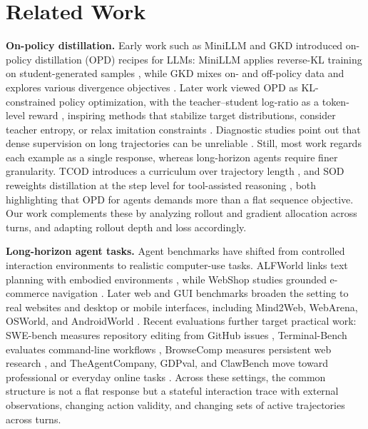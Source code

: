 \section{Related Work}
\label{sec:related}

\textbf{On-policy distillation.}
Early work such as MiniLLM and GKD introduced on-policy distillation (OPD) recipes for LLMs: MiniLLM applies reverse-KL training on student-generated samples \citep{gu2024minillm}, while GKD mixes on- and off-policy data and explores various divergence objectives \citep{agarwal2024opd}. Later work viewed OPD as KL-constrained policy optimization, with the teacher--student log-ratio as a token-level reward \citep{lu2025onpolicydistillation,yang2026gopd}, inspiring methods that stabilize target distributions, consider teacher entropy, or relax imitation constraints \citep{jang2026veto,jin2026entropy,ko2026reopold,zhao2026self}. Diagnostic studies point out that dense supervision on long trajectories can be unreliable \citep{li2026rethinking,zhang2026full}. Still, most work regards each example as a single response, whereas long-horizon agents require finer granularity. TCOD introduces a curriculum over trajectory length \citep{wang2026tcod}, and SOD reweights distillation at the step level for tool-assisted reasoning \citep{zhong2026sod}, both highlighting that OPD for agents demands more than a flat sequence objective. Our work complements these by analyzing rollout and gradient allocation across turns, and adapting rollout depth and loss accordingly.

\textbf{Long-horizon agent tasks.}
Agent benchmarks have shifted from controlled interaction
environments to realistic computer-use tasks. ALFWorld links text planning with
embodied environments \citep{shridhar2021alfworld}, while WebShop studies grounded
e-commerce navigation \citep{yao2022webshop}. Later web and GUI
benchmarks broaden the setting to real websites and desktop or mobile
interfaces, including Mind2Web, WebArena, OSWorld, and AndroidWorld
\citep{deng2023mind2web,zhou2023webarena,xie2024osworld,rawles2025androidworld}.
Recent evaluations further target practical work: SWE-bench measures repository
editing from GitHub issues \citep{jimenez2023swebench}, Terminal-Bench evaluates
command-line workflows \citep{merrill2026terminalbench}, BrowseComp measures
persistent web research \citep{wei2025browsecomp}, and TheAgentCompany,
GDPval, and ClawBench move toward professional or everyday online tasks
\citep{xu2024agentcompany,patwardhan2025gdpval,zhang2026clawbench}. Across
these settings, the common structure is not a flat response but a stateful
interaction trace with external observations, changing action validity, and
changing sets of active trajectories across turns.
